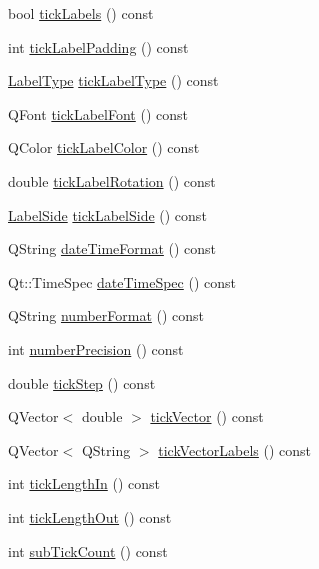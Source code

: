 \begin{DoxyCompactItemize}
\item 
bool \hyperlink{class_q_c_p_axis_a9a78fcccd98a73d37b3d991df7b6ef1d}{tick\+Labels} () const 
\item 
int \hyperlink{class_q_c_p_axis_af7bc2fac3f95949ecd0204d20dc1463b}{tick\+Label\+Padding} () const 
\item 
\hyperlink{class_q_c_p_axis_a4a7da0166f755f5abac23b765d184cad}{Label\+Type} \hyperlink{class_q_c_p_axis_a8a6f58a1ce12cfc4fadd379167668e8d}{tick\+Label\+Type} () const 
\item 
Q\+Font \hyperlink{class_q_c_p_axis_af6d7ad17f3398b114a413f7a3dc5ef9d}{tick\+Label\+Font} () const 
\item 
Q\+Color \hyperlink{class_q_c_p_axis_ac86d0636aa55ddd94df171f609897a32}{tick\+Label\+Color} () const 
\item 
double \hyperlink{class_q_c_p_axis_ab9199d72b8c4c06cc6c9b928c30d00d2}{tick\+Label\+Rotation} () const 
\item 
\hyperlink{class_q_c_p_axis_a24b13374b9b8f75f47eed2ea78c37db9}{Label\+Side} \hyperlink{class_q_c_p_axis_a0a33835705406506b02a445b1ba32357}{tick\+Label\+Side} () const 
\item 
Q\+String \hyperlink{class_q_c_p_axis_a132b54ae184a12ed24c9af24f53dc70b}{date\+Time\+Format} () const 
\item 
Qt\+::\+Time\+Spec \hyperlink{class_q_c_p_axis_afdd04c56ed29a9d948f840fc76f0d383}{date\+Time\+Spec} () const 
\item 
Q\+String \hyperlink{class_q_c_p_axis_ae6729b40845b29ffa5a440aa53cec215}{number\+Format} () const 
\item 
int \hyperlink{class_q_c_p_axis_a91cb2825060ac79a889296377fe0c7c1}{number\+Precision} () const 
\item 
double \hyperlink{class_q_c_p_axis_a0e6120d24266544441ab691f316a1b03}{tick\+Step} () const 
\item 
Q\+Vector$<$ double $>$ \hyperlink{class_q_c_p_axis_a5b00b14f480f926df976cc6c52309e78}{tick\+Vector} () const 
\item 
Q\+Vector$<$ Q\+String $>$ \hyperlink{class_q_c_p_axis_a64e6fa81f943ad33dcaf3fa606687b93}{tick\+Vector\+Labels} () const 
\item 
int \hyperlink{class_q_c_p_axis_a59265d65c5034695ac2578bccbbb0f4a}{tick\+Length\+In} () const 
\item 
int \hyperlink{class_q_c_p_axis_ae1b3d7473f50ba8544b2027c1cdc80f2}{tick\+Length\+Out} () const 
\item 
int \hyperlink{class_q_c_p_axis_a290b4c1375476826daa10e914cb71dab}{sub\+Tick\+Count} () const 

\end{DoxyCompactItemize}
